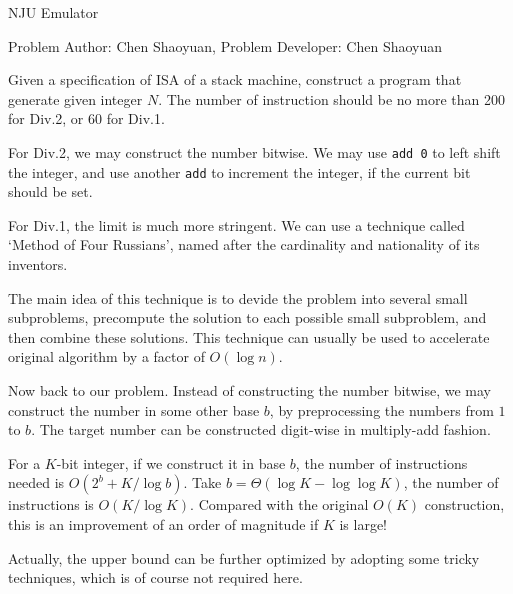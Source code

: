 \begin{Solution}{NJU Emulator}

\begin{frame}{\ProblemName}

\small Problem Author: Chen Shaoyuan, Problem Developer: Chen Shaoyuan \par \vspace{0.3cm}


Given a specification of ISA of a stack machine, construct a program that generate given integer $N$. The number of instruction should be no more than 200 for Div.2, or 60 for Div.1.

\pause

For Div.2, we may construct the number bitwise. We may use \texttt{add 0} to left shift the integer, and use another \texttt{add} to increment the integer, if the current bit should be set.

\end{frame}

\begin{frame}{\ProblemName}

For Div.1, the limit is much more stringent. We can use a technique called `Method of Four Russians', named after the cardinality and nationality of its inventors. 

\pause

The main idea of this technique is to devide the problem into several small subproblems, precompute the solution to each possible small subproblem, and then combine these solutions. This technique can usually be used to accelerate original algorithm by a factor of $O(\log n)$.

\end{frame}

\begin{frame}{\ProblemName}

Now back to our problem. Instead of constructing the number bitwise, we may construct the number in some other base $b$, by preprocessing the numbers from $1$ to $b$. The target number can be constructed digit-wise in multiply-add fashion. 

\pause

For a $K$-bit integer, if we construct it in base $b$, the number of instructions needed is $O(2^b + K / \log b)$. Take $b = \Theta(\log K - \log \log K)$, the number of instructions is $O(K / \log K)$. Compared with the original $O(K)$ construction, this is an improvement of an order of magnitude if $K$ is large!

\pause

Actually, the upper bound can be further optimized by adopting some tricky techniques, which is of course not required here.

\end{frame}

\end{Solution}
